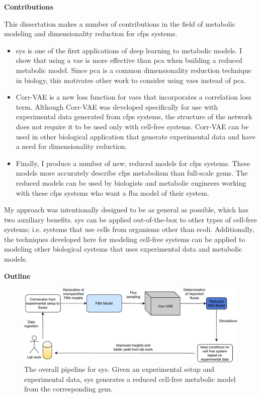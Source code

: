 \textbf{Contributions}

This dissertation makes a number of contributions in the field of metabolic modeling and dimensionality reduction for \gls{cfps} systems.
\begin{itemize}
\item \gls{sys} is one of the first applications of deep learning to metabolic models.
I show that using a \gls{vae} is more effective than \gls{pca} when building a reduced metabolic model.
Since \gls{pca} is a common dimensionality reduction technique in biology, this motivates other work to consider using \glspl{vae} instead of \gls{pca}.
\item Corr-VAE is a new loss function for \glspl{vae} that incorporates a correlation loss term.
Although Corr-VAE was developed specifically for use with experimental data generated from \gls{cfps} systems, the structure of the network does not require it to be used only with cell-free systems.
Corr-VAE can be used in other biological application that generate experimental data and have a need for dimensionality reduction.
\item Finally, I produce a number of new, reduced models for \gls{cfps} systems.
These models more accurately describe \gls{cfps} metabolism than full-scale \glspl{gem}.
The reduced models can be used by biologists and metabolic engineers working with these \gls{cfps} systems who want a \gls{fba} model of their system.
\end{itemize}

My approach was intentionally designed to be as general as possible, which has two auxiliary benefits.
\gls{sys} can be applied out-of-the-box to other types of cell-free systems; i.e. systems that use cells from organisms other than \gls{ecoli}.
Additionally, the techniques developed here for modeling cell-free systems can be applied to modeling other biological systems that uses experimental data and metabolic models.

\textbf{Outline}
\begin{figure}[t!]
\begin{center}
\includegraphics[width=\textwidth]{figs/SystemOverview.pdf}
\end{center}
\caption[The overall pipeline for \gls{sys}]{The overall pipeline for \gls{sys}.
Given an experimental setup and experimental data, \gls{sys} generates a reduced cell-free metabolic model from the corresponding \gls{gem}.}
\label{fig:overview}
\end{figure}

